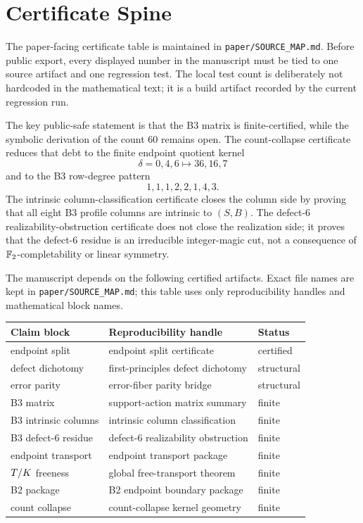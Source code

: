 \section{Certificate Spine}
\label{sec:certificates}

The paper-facing certificate table is maintained in \texttt{paper/SOURCE\_MAP.md}.
Before public export, every displayed number in the manuscript must be tied to
one source artifact and one regression test.  The local test count is deliberately
not hardcoded in the mathematical text; it is a build artifact recorded by the
current regression run.

The key public-safe statement is that the B3 matrix is finite-certified, while
the symbolic derivation of the count \(60\) remains open.  The count-collapse
certificate reduces that debt to the finite endpoint quotient kernel
\[
  \delta=0,4,6 \mapsto 36,16,7
\]
and to the B3 row-degree pattern
\[
  1,1,1,2,2,1,4,3.
\]
The intrinsic column-classification certificate closes the column side by proving that all eight B3 profile columns are
intrinsic to \((S,B)\).  The defect-6 realizability-obstruction certificate does not close the realization side; it proves
that the defect-6 residue is an irreducible integer-magic cut, not a consequence
of \(\mathbb F_2\)-completability or linear symmetry.

\begin{certprop}
The manuscript depends on the following certified artifacts.  Exact file names
are kept in \texttt{paper/SOURCE\_MAP.md}; this table uses only reproducibility
handles and mathematical block names.
\begin{center}
\scriptsize
\begin{tabular}{lll}
\toprule
Claim block & Reproducibility handle & Status\\
\midrule
endpoint split & endpoint split certificate & certified\\
defect dichotomy & first-principles defect dichotomy & structural\\
error parity & error-fiber parity bridge & structural\\
B3 matrix & support-action matrix summary & finite\\
B3 intrinsic columns & intrinsic column classification & finite\\
B3 defect-6 residue & defect-6 realizability obstruction & finite\\
endpoint transport & endpoint transport package & finite\\
\(T/K\) freeness & global free-transport theorem & finite\\
B2 package & B2 endpoint boundary package & finite\\
count collapse & count-collapse kernel geometry & finite\\
\bottomrule
\end{tabular}
\end{center}
\end{certprop}


